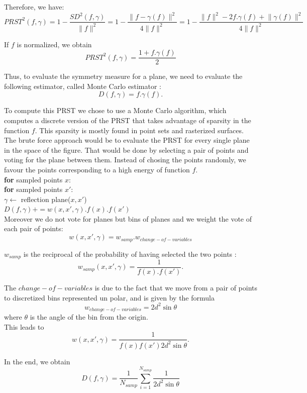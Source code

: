 \documentclass[10pt,a4paper]{article}			%
\begin{document}
Therefore, we have:
$$ PRST^2(f,\gamma) = 1 - \frac{SD^2(f,\gamma)}{\lVert f \lVert ^2} =  1 - \frac{\lVert f - \gamma(f) \lVert ^2 }{4 \lVert f \lVert ^2}	=  1 - \frac{\lVert f \lVert ^2 - 2f.\gamma(f) + \lVert \gamma(f) \lVert ^2 }{4 \lVert f \lVert ^2} $$

If $f$ is normalized, we obtain
$$ PRST^2(f,\gamma) = \frac{1 + f.\gamma(f)}{2} $$

	Thus, to evaluate the symmetry measure for a plane, we need to evaluate the following estimator, called Monte Carlo estimator :
$$ D(f,\gamma) = f.\gamma(f). $$
	
	To compute this PRST we chose to use a Monte Carlo algorithm, which computes a discrete version of the PRST that takes advantage of sparsity in the function $f$. This sparsity is mostly found in  point sets and rasterized surfaces.
	The brute force approach would be to evaluate the PRST for every single plane in the space of the figure. That would be done by selecting a pair of points and voting for the plane between them. Instead of chosing the points randomly, we favour the points corresponding to a high energy of function $f$.\\
	

\indent \indent \textbf{for} sampled points $x$:\\
\indent \indent \indent \textbf{for} sampled points $x'$: \\
\indent \indent \indent \indent $\gamma \leftarrow$ reflection plane($x, x'$)\\
\indent \indent \indent \indent $D(f,\gamma) += w(x, x',\gamma).f(x).f(x')$\\
	
Moreover we do not vote for planes but bins of planes and we weight the vote of each pair of points:
$$ w(x, x',\gamma) = w_{samp} . w_{change-of-variables} $$

$w_{samp}$ is the reciprocal of the probability of having selected the two points :
$$w_{samp}(x, x',\gamma) = \frac{1}{f(x).f(x')}. $$

The $change-of-variables$ is due to the fact that we move from a pair of points to discretized bins represented un polar, and is given by the formula \[w_{change-of-variables} = 2d^2\sin\theta\]
where $\theta$ is the angle of the bin from the origin.\\

This leads to $$ w(x, x',\gamma) = \frac{1}{f(x)f(x')2d^2\sin\theta}. $$

In the end, we obtain $$D(f,\gamma) = \frac{1}{N_{samp}} \sum_{i=1}^{N_{samp}}\frac{1}{2d^2\sin\theta}$$
\end{document}
